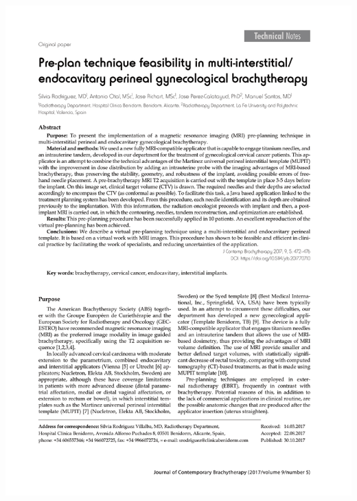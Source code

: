 \documentclass[
  a4paper,
]{scrreprt}
\begin{document}
\includegraphics{articulos/preplan/preplan-1.png}
\end{document}
